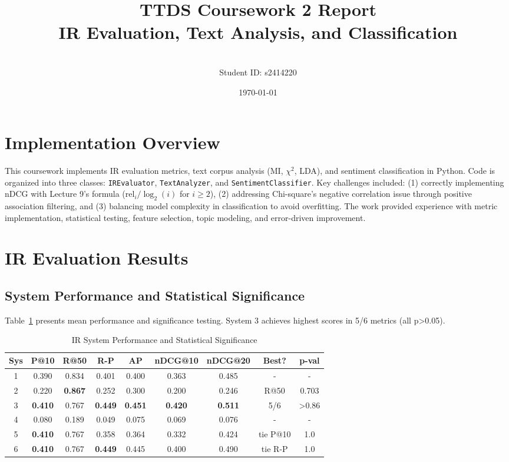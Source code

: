\documentclass[10pt,a4paper]{article}
\title{\textbf{TTDS Coursework 2 Report} \\ 
IR Evaluation, Text Analysis, and Classification}
\author{\\ Student ID: s2414220}
\date{\today}
\begin{document}
\maketitle

\section{Implementation Overview}

This coursework implements IR evaluation metrics, text corpus analysis (MI, $\chi^2$, LDA), and sentiment classification in Python. Code is organized into three classes: \texttt{IREvaluator}, \texttt{TextAnalyzer}, and \texttt{SentimentClassifier}. Key challenges included: (1) correctly implementing nDCG with Lecture 9's formula ($\text{rel}_i / \log_2(i)$ for $i \geq 2$), (2) addressing Chi-square's negative correlation issue through positive association filtering, and (3) balancing model complexity in classification to avoid overfitting. The work provided experience with metric implementation, statistical testing, feature selection, topic modeling, and error-driven improvement.

\section{IR Evaluation Results}

\subsection{System Performance and Statistical Significance}

Table~\ref{tab:ir_combined} presents mean performance and significance testing. System 3 achieves highest scores in 5/6 metrics (all p>0.05).

\begin{table}[h]
\centering
\caption{IR System Performance and Statistical Significance}
\label{tab:ir_combined}
\scriptsize
\begin{tabular}{ccccccc|cc}
\toprule
\textbf{Sys} & \textbf{P@10} & \textbf{R@50} & \textbf{R-P} & \textbf{AP} & \textbf{nDCG@10} & \textbf{nDCG@20} & \textbf{Best?} & \textbf{p-val} \\
\midrule
1 & 0.390 & 0.834 & 0.401 & 0.400 & 0.363 & 0.485 & - & - \\
2 & 0.220 & \textbf{0.867} & 0.252 & 0.300 & 0.200 & 0.246 & R@50 & 0.703 \\
3 & \textbf{0.410} & 0.767 & \textbf{0.449} & \textbf{0.451} & \textbf{0.420} & \textbf{0.511} & 5/6 & >0.86 \\
4 & 0.080 & 0.189 & 0.049 & 0.075 & 0.069 & 0.076 & - & - \\
5 & \textbf{0.410} & 0.767 & 0.358 & 0.364 & 0.332 & 0.424 & tie P@10 & 1.0 \\
6 & \textbf{0.410} & 0.767 & \textbf{0.449} & 0.445 & 0.400 & 0.490 & tie R-P & 1.0 \\
\bottomrule
\end{tabular}
\end{table}
\end{document}
